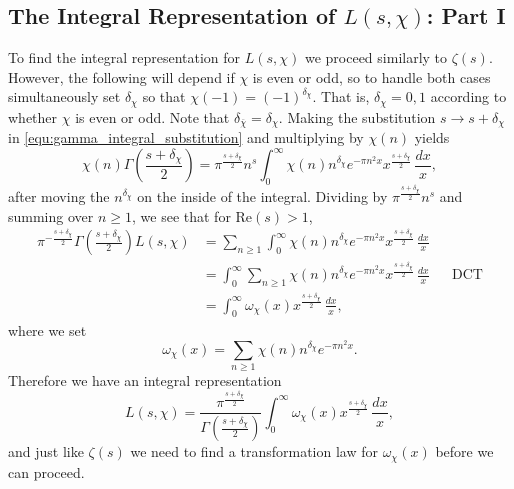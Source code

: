 \documentclass[12pt]{book}
\theoremstyle{definition}\newframedtheorem{method}{Method}
\renewcommand{\d}{\delta}
\newcommand{\z}{\zeta}
\newcommand{\w}{\omega}
\newcommand{\G}{\Gamma}
\newcommand{\<}{\langle}
\renewcommand{\>}{\rangle}
\newcommand{\conj}{\overline}
\newcommand{\cchi}{\conj{\chi}}
\renewcommand{\Re}{\mathrm{Re}}
\begin{document}
    \subsection*{The Integral Representation of \texorpdfstring{$L(s,\chi)$}{L(s,x)}: Part I}
      To find the integral representation for $L(s,\chi)$ we proceed similarly to $\z(s)$. However, the following will depend if $\chi$ is even or odd, so to handle both cases simultaneously set $\d_{\chi}$ so that $\chi(-1) = (-1)^{\d_{\chi}}$. That is, $\d_{\chi} = 0,1$ according to whether $\chi$ is even or odd. Note that $\d_{\cchi} = \d_{\chi}$. Making the substitution $s \to s+\d_{\chi}$ in \cref{equ:gamma_integral_substitution} and multiplying by $\chi(n)$ yields
      \[
        \chi(n)\G\left(\frac{s+\d_{\chi}}{2}\right) = \pi^{\frac{s+\d_{\chi}}{2}} n^{s}\int_{0}^{\infty}\chi(n)n^{\d_{\chi}}e^{-\pi n^{2}x}x^{\frac{s+\d_{\chi}}{2}}\,\frac{dx}{x},
      \]
      after moving the $n^{\d_{\chi}}$ on the inside of the integral. Dividing by $\pi^{\frac{s+\d_{\chi}}{2}}n^{s}$ and summing over $n \ge 1$, we see that for $\Re(s) > 1$,
      \begin{align*}
        \pi^{-\frac{s+\d_{\chi}}{2}}\G\left(\frac{s+\d_{\chi}}{2}\right)L(s,\chi) &= \sum_{n \ge 1}\int_{0}^{\infty}\chi(n)n^{\d_{\chi}}e^{-\pi n^{2}x}x^{\frac{s+\d_{\chi}}{2}}\,\frac{dx}{x} \\
        &= \int_{0}^{\infty}\sum_{n \ge 1}\chi(n)n^{\d_{\chi}}e^{-\pi n^{2}x}x^{\frac{s+\d_{\chi}}{2}}\,\frac{dx}{x} && \text{DCT} \\
        &= \int_{0}^{\infty}\w_{\chi}(x)x^{\frac{s+\d_{\chi}}{2}}\,\frac{dx}{x},
      \end{align*}
      where we set
      \[
        \w_{\chi}(x) = \sum_{n \ge 1}\chi(n)n^{\d_{\chi}}e^{-\pi n^{2}x}.
      \]
      Therefore we have an integral representation
      \begin{equation}\label{equ:integral_representation_Dirichlet_L-functions_1}
        L(s,\chi) = \frac{\pi^{\frac{s+\d_{\chi}}{2}}}{\G\left(\frac{s+\d_{\chi}}{2}\right)}\int_{0}^{\infty}\w_{\chi}(x)x^{\frac{s+\d_{\chi}}{2}}\,\frac{dx}{x},
      \end{equation}
      and just like $\z(s)$ we need to find a transformation law for $\w_{\chi}(x)$ before we can proceed.
\end{document}
